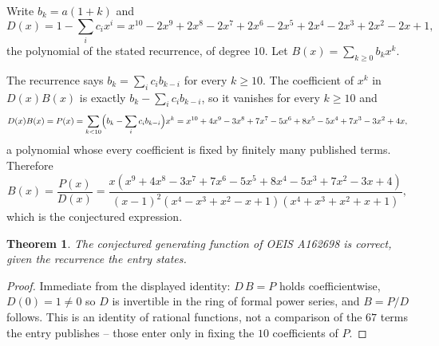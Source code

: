\documentclass[11pt,a4paper]{article}
\theoremstyle{plain}
\newtheorem{theorem}{Theorem}
\theoremstyle{definition}
\begin{document}
Write $b_k=a(1+k)$ and
\[
  D(x)=1-\sum_{i} c_i x^{i}=x^{10} - 2 x^{9} + 2 x^{8} - 2 x^{7} + 2 x^{6} - 2 x^{5} + 2 x^{4} - 2 x^{3} + 2 x^{2} - 2 x + 1 ,
\]
the polynomial of the stated recurrence, of degree $10$. Let $B(x)=\sum_{k\ge0}b_kx^k$.

The recurrence says $b_k=\sum_i c_ib_{k-i}$ for every $k\ge 10$. The coefficient of $x^k$ in
$D(x)B(x)$ is exactly $b_k-\sum_i c_ib_{k-i}$, so it vanishes for every $k\ge 10$ and
\[
  D(x)B(x)=P(x)=\sum_{k<10}\Bigl(b_k-\sum_i c_ib_{k-i}\Bigr)x^k
         =x^{10} + 4 x^{9} - 3 x^{8} + 7 x^{7} - 5 x^{6} + 8 x^{5} - 5 x^{4} + 7 x^{3} - 3 x^{2} + 4 x ,
\]
a polynomial whose every coefficient is fixed by finitely many published terms. Therefore
\[
  B(x)=\frac{P(x)}{D(x)}=\frac{x \left(x^{9} + 4 x^{8} - 3 x^{7} + 7 x^{6} - 5 x^{5} + 8 x^{4} - 5 x^{3} + 7 x^{2} - 3 x + 4\right)}{\left(x - 1\right)^{2} \left(x^{4} - x^{3} + x^{2} - x + 1\right) \left(x^{4} + x^{3} + x^{2} + x + 1\right)} ,
\]
which is the conjectured expression.

\begin{theorem}
The conjectured generating function of OEIS A162698 is correct, given the recurrence the entry
states.
\end{theorem}

\begin{proof}
Immediate from the displayed identity: $D\,B=P$ holds coefficientwise, $D(0)=1\ne0$ so $D$ is
invertible in the ring of formal power series, and $B=P/D$ follows. This is an identity of
rational functions, not a comparison of the $67$ terms the entry publishes -- those
enter only in fixing the $10$ coefficients of $P$.
\end{proof}
\end{document}
